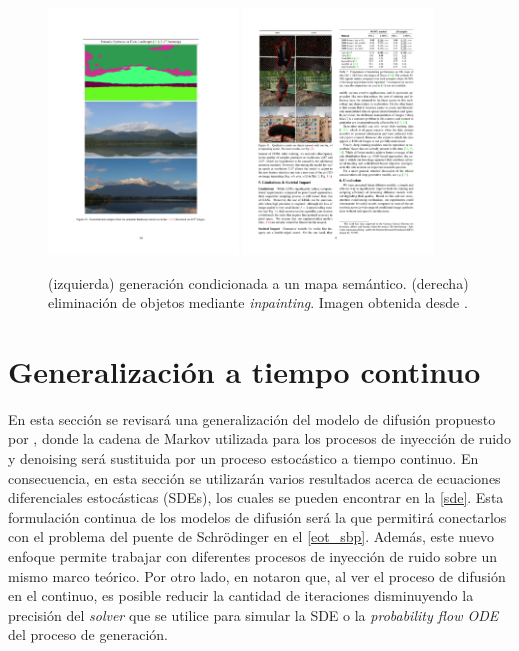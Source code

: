 \begin{figure}
    \centering
    \includegraphics[width=0.45\textwidth]{images/dm/ldm_semantic_synthesis}
    \includegraphics[width=0.45\textwidth]{images/dm/ldm_object_removal}
    \caption{(izquierda) generación condicionada a un mapa semántico. (derecha) eliminación de objetos mediante \textit{inpainting}. Imagen obtenida desde \cite{rombach2022highresolution}.}
    \label{img:ldm_inpainting}
\end{figure}

\section{Generalización a tiempo continuo}
\label{dm/continuous_dm}

En esta sección se revisará una generalización del modelo de difusión propuesto por \cite{ho2020denoising}, donde la cadena de Markov utilizada para los procesos de inyección de ruido y denoising será sustituida por un proceso estocástico a tiempo continuo. En consecuencia, en esta sección se utilizarán varios resultados acerca de ecuaciones diferenciales estocásticas (SDEs), los cuales se pueden encontrar en la \autoref{sde}. Esta formulación continua de los modelos de difusión será la que permitirá conectarlos con el problema del puente de Schrödinger en el \autoref{eot_sbp}. Además, este nuevo enfoque permite trabajar con diferentes procesos de inyección de ruido sobre un mismo marco teórico. Por otro lado, en \cite{song2021scorebased} notaron que, al ver el proceso de difusión en el continuo, es posible reducir la cantidad de iteraciones disminuyendo la precisión del \textit{solver} que se utilice para simular la SDE o la \textit{probability flow ODE} del proceso de generación.

